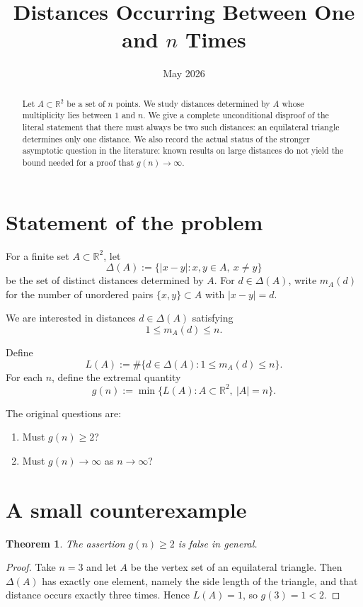 \documentclass[12pt]{article}
\title{Distances Occurring Between One and $n$ Times}
\author{}
\date{May 2026}
\newtheorem{theorem}{Theorem}
\begin{document}
\maketitle

\begin{abstract}
Let $A \subset \mathbb{R}^2$ be a set of $n$ points. We study distances determined by $A$ whose multiplicity lies between $1$ and $n$. We give a complete unconditional disproof of the literal statement that there must always be two such distances: an equilateral triangle determines only one distance. We also record the actual status of the stronger asymptotic question in the literature: known results on large distances do not yield the bound needed for a proof that $g(n) \to \infty$.
\end{abstract}

\section{Statement of the problem}

For a finite set $A \subset \mathbb{R}^2$, let
\[
\Delta(A) := \{ |x-y| : x,y \in A,\ x \neq y \}
\]
be the set of distinct distances determined by $A$. For $d \in \Delta(A)$, write $m_A(d)$ for the number of unordered pairs $\{x,y\} \subset A$ with $|x-y| = d$.

We are interested in distances $d \in \Delta(A)$ satisfying
\[
1 \le m_A(d) \le n.
\]

Define
\[
L(A) := \#\{ d \in \Delta(A) : 1 \le m_A(d) \le n \}.
\]
For each $n$, define the extremal quantity
\[
g(n) := \min\{ L(A) : A \subset \mathbb{R}^2,\ |A|=n \}.
\]

The original questions are:
\begin{enumerate}
\item Must $g(n) \ge 2$?
\item Must $g(n) \to \infty$ as $n \to \infty$?
\end{enumerate}

\section{A small counterexample}

\begin{theorem}
The assertion $g(n) \ge 2$ is false in general.
\end{theorem}

\begin{proof}
Take $n=3$ and let $A$ be the vertex set of an equilateral triangle. Then $\Delta(A)$ has exactly one element, namely the side length of the triangle, and that distance occurs exactly three times. Hence $L(A)=1$, so $g(3)=1<2$.
\end{proof}
\end{document}
